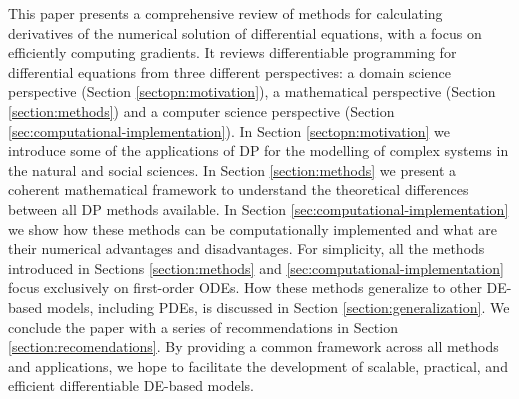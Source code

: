 This paper presents a comprehensive review of methods for calculating derivatives of the numerical solution of differential equations, with a focus on efficiently computing gradients. 
It reviews differentiable programming for differential equations from three different perspectives: a domain science perspective (Section \ref{sectopn:motivation}), a mathematical perspective (Section \ref{section:methods}) and a computer science perspective (Section \ref{sec:computational-implementation}). 
In Section \ref{sectopn:motivation} we introduce some of the applications of DP for the modelling of complex systems in the natural and social sciences. 
In Section \ref{section:methods} we present a coherent mathematical framework to understand the theoretical differences between all DP methods available.
In Section \ref{sec:computational-implementation} we show how these methods can be computationally implemented and what are their numerical advantages and disadvantages.
For simplicity, all the methods introduced in Sections \ref{section:methods} and \ref{sec:computational-implementation} focus exclusively on first-order ODEs. 
How these methods generalize to other DE-based models, including PDEs, is discussed in Section \ref{section:generalization}.
We conclude the paper with a series of recommendations in Section \ref{section:recomendations}.
By providing a common framework across all methods and applications, we hope to facilitate the development of scalable, practical, and efficient differentiable DE-based models. 

